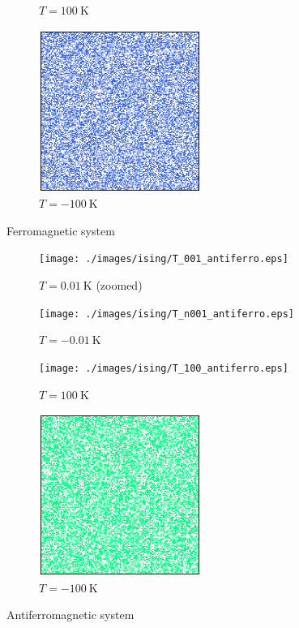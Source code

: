 \begin{figure}[ht]
\begin{subfigure}{.45\textwidth}
        \caption*{$T = \SI{100}{\kelvin}$}
    \end{subfigure}
    \begin{subfigure}{.45\textwidth}
        \centering
        \includegraphics[width=200px]{./images/ising/T_n100_ferro.eps}
        \caption*{$T = \SI{-100}{\kelvin}$}
    \end{subfigure}
    \caption{Ferromagnetic system}
    \label{fig:MC_single_final_state_ferro}
\end{figure}
\begin{figure}[ht]
    \begin{subfigure}{.45\textwidth}
        \centering
        \texttt{[image: ./images/ising/T\_001\_antiferro.eps]}
        \caption*{\hspace{20pt} $T = \SI{0.01}{\kelvin}$ (zoomed)}
    \end{subfigure}
    \begin{subfigure}{.45\textwidth}
        \centering
        \texttt{[image: ./images/ising/T\_n001\_antiferro.eps]}
        \caption*{$T = \SI{-0.01}{\kelvin}$}
    \end{subfigure}
    \newline
    \begin{subfigure}{.45\textwidth}
        \centering
        \texttt{[image: ./images/ising/T\_100\_antiferro.eps]}
        \caption*{$T = \SI{100}{\kelvin}$}
    \end{subfigure}
    \begin{subfigure}{.45\textwidth}
        \centering
        \includegraphics[width=200px]{./images/ising/T_n100_antiferro.eps}
        \caption*{$T = \SI{-100}{\kelvin}$}
    \end{subfigure}
    \caption{Antiferromagnetic system}
    \label{fig:MC_single_final_state_antiferro}
\end{figure}
